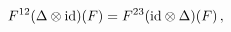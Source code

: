 \begin{equation}\label{boro2.2}
F^{12}(\Delta\otimes{\rm id})(F)=F^{23}({\rm id}\otimes\Delta)(F)\,,
\end{equation}

